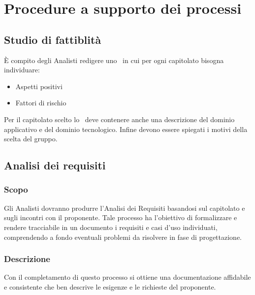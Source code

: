 \documentclass[12pt,a4paper]{article}
\begin{document}
\section{Procedure a supporto dei processi}

\subsection{Studio di fattiblità}
È compito degli Analisti redigere uno \SdF\ in cui per ogni capitolato bisogna individuare:
\begin{itemize}
\item Aspetti positivi
\item Fattori di rischio
\end{itemize}
Per il capitolato scelto lo \SdF\ deve contenere anche una descrizione del dominio applicativo e del dominio tecnologico. Infine devono essere spiegati i motivi della scelta del gruppo.


\subsection{Analisi dei requisiti} %

\subsubsection{Scopo}
Gli Analisti dovranno produrre l'Analisi dei Requisiti basandosi sul capitolato e sugli incontri con il proponente. Tale processo ha l'obiettivo di formalizzare e rendere tracciabile in un documento i requisiti e casi d'uso individuati, comprendendo a fondo eventuali problemi da risolvere in fase di progettazione.

\subsubsection{Descrizione}
Con il completamento di questo processo si ottiene una documentazione affidabile e consistente che ben descrive le esigenze e le richieste del proponente.
\end{document}
